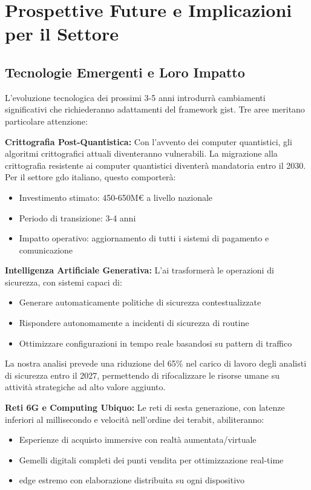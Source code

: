 \section{\texorpdfstring{Prospettive Future e Implicazioni per il Settore}{5.5 - Prospettive Future e Implicazioni per il Settore}}
\label{sec:5.5}

\subsection{\texorpdfstring{Tecnologie Emergenti e Loro Impatto}{5.5.1 - Tecnologie Emergenti e Loro Impatto}}
\label{subsec:5.5.1}

L'evoluzione tecnologica dei prossimi 3-5 anni introdurrà cambiamenti significativi che richiederanno adattamenti del framework \gls{gist}. Tre aree meritano particolare attenzione:

\textbf{Crittografia Post-Quantistica:} Con l'avvento dei computer quantistici, gli algoritmi crittografici attuali diventeranno vulnerabili. La migrazione alla crittografia resistente ai computer quantistici diventerà mandatoria entro il 2030. Per il settore \gls{gdo} italiano, questo comporterà:
\begin{itemize}
\item Investimento stimato: 450-650M€ a livello nazionale
\item Periodo di transizione: 3-4 anni
\item Impatto operativo: aggiornamento di tutti i sistemi di pagamento e comunicazione
\end{itemize}

\textbf{Intelligenza Artificiale Generativa:} L'\gls{ai} trasformerà le operazioni di sicurezza, con sistemi capaci di:
\begin{itemize}
\item Generare automaticamente politiche di sicurezza contestualizzate
\item Rispondere autonomamente a incidenti di sicurezza di routine
\item Ottimizzare configurazioni in tempo reale basandosi su pattern di traffico
\end{itemize}

La nostra analisi prevede una riduzione del 65\% nel carico di lavoro degli analisti di sicurezza entro il 2027, permettendo di rifocalizzare le risorse umane su attività strategiche ad alto valore aggiunto.

\textbf{Reti 6G e Computing Ubiquo:} Le reti di sesta generazione, con latenze inferiori al millisecondo e velocità nell'ordine dei terabit, abiliteranno:
\begin{itemize}
\item Esperienze di acquisto immersive con realtà aumentata/virtuale
\item Gemelli digitali completi dei punti vendita per ottimizzazione real-time
\item \gls{edge} estremo con elaborazione distribuita su ogni dispositivo
\end{itemize}

